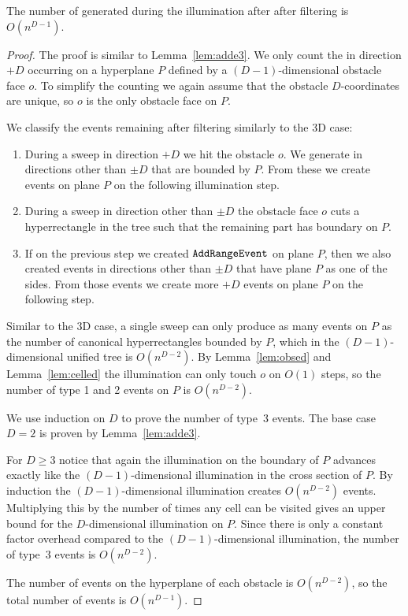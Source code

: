 \documentclass[english,gradu]{tktltiki2018}
\begin{document}
\begin{lem}\label{lem:added}The number of \addEs generated during the illumination after after filtering is $O(n^{D-1})$.\end{lem}
\begin{proof}
The proof is similar to Lemma~\ref{lem:adde3}.
We only count the \addEs in direction $+D$ occurring on a hyperplane $P$ defined by a $(D-1)$-dimensional obstacle face $o$.
To simplify the counting we again assume that the obstacle $D$-coordinates are unique, so $o$ is the only obstacle face on $P$.

We classify the events remaining after filtering similarly to the 3D case:
\begin{enumerate}
\item During a sweep in direction $+D$ we hit the obstacle $o$.
	We generate \addEs in directions other than $\pm D$ that are bounded by $P$.
	From these \addEs we create events on plane $P$ on the following illumination step.
\item During a sweep in direction other than $\pm D$ the obstacle face $o$ cuts a hyperrectangle in the tree such that the remaining part has boundary on $P$.
\item If on the previous step we created $\mathtt{AddRangeEvent}$ on plane $P$, then we also created events in directions other than $\pm D$ that have plane $P$ as one of the sides.
	From those events we create more $+D$ events on plane $P$ on the following step.
\end{enumerate}

Similar to the 3D case, a single sweep can only produce as many events on $P$ as the number of canonical hyperrectangles bounded by $P$, which in the $(D-1)$-dimensional unified tree is $O(n^{D-2})$.
By Lemma~\ref{lem:obsed} and Lemma~\ref{lem:celled} the illumination can only touch $o$ on $O(1)$ steps, so the number of type 1 and 2 events on $P$ is $O(n^{D-2})$.

We use induction on $D$ to prove the number of type~3 events.
The base case $D=2$ is proven by Lemma~\ref{lem:adde3}.

For $D\ge 3$ notice that again the illumination on the boundary of $P$ advances exactly like the $(D-1)$-dimensional illumination in the cross section of $P$.
By induction the $(D-1)$-dimensional illumination creates $O(n^{D-2})$ events.
Multiplying this by the number of times any cell can be visited gives an upper bound for the $D$-dimensional illumination on $P$.
Since there is only a constant factor overhead compared to the $(D-1)$-dimensional illumination, the number of type~3 events is $O(n^{D-2})$.

The number of events on the hyperplane of each obstacle is $O(n^{D-2})$, so the total number of events is $O(n^{D-1})$.
\end{proof}
\end{document}
